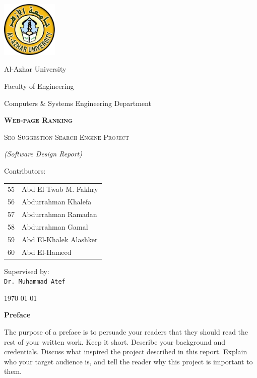 \documentclass{scrartcl}
\newenvironment{preface}{
  \begin{center}
    {\Large \textbf{Preface}}
    \vspace{0.5cm}
    \par
    \begin{minipage}{0.8\linewidth}}{\end{minipage}
    \noindent\ignorespaces
  \end{center}
}
\begin{document}
\begin{titlepage}
	\centering
	\includegraphics[width=0.2\textwidth]{al-azhar.png}\par\vspace{12pt}
	{\LARGE Al-Azhar University \par}\vspace{3pt}
	{\Large Faculty of Engineering \par}
	{\Large Computers \& Systems Engineering Department \par}\vspace{12pt}
	\vfill
	{\huge\bfseries\scshape Web-page Ranking \par}\vspace{8pt}
  {\scshape Seo Suggestion Search Engine Project \par}\vspace{8pt}
  {\itshape (Software Design Report) \par}
	\vfill
	{\Large Contributors: \\[12pt]
    \Large\itshape
    \begin{tabular}{ll}
      55 & Abd El-Twab M. Fakhry \\
      56 & Abdurrahman Khalefa \\
      57 & Abdurrahman Ramadan \\
      58 & Abdurrahman Gamal \\
      59 & Abd El-Khalek Alashker \\
      60 & Abd El-Hameed \\
    \end{tabular}
  }\par
	\vspace{1cm}
	\vfill
  {\Large{Supervised by:} \\
	\texttt{Dr. Muhammad Atef} \par}
  \vfill
  {\large \today \par}
\end{titlepage}

\newpage

\begin{preface}
  The purpose of a preface is to persuade your readers that they should read the rest of your written work. Keep it short. Describe your background and credentials. Discuss what inspired the project described in this report. Explain who your target audience is, and tell the reader why this project is important to them.
\end{preface}\vspace{1cm}
\end{document}
